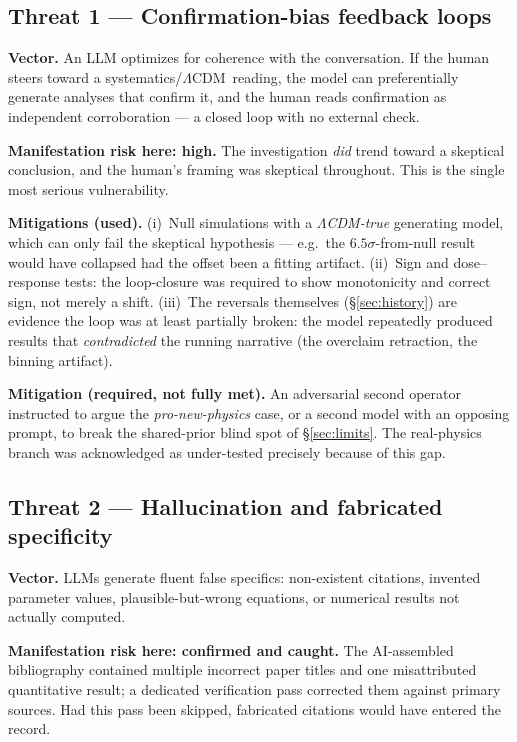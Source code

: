 \documentclass[11pt]{article}
\newcommand{\LCDM}{$\Lambda$CDM}
\begin{document}
\subsection{Threat 1 --- Confirmation-bias feedback loops}
\textbf{Vector.} An LLM optimizes for coherence with the conversation. If the human steers toward a systematics/\LCDM\ reading, the model can preferentially generate analyses that confirm it, and the human reads confirmation as independent corroboration --- a closed loop with no external check.

\textbf{Manifestation risk here: high.} The investigation \emph{did} trend toward a skeptical conclusion, and the human's framing was skeptical throughout. This is the single most serious vulnerability.

\textbf{Mitigations (used).} (i)~Null simulations with a \emph{\LCDM-true} generating model, which can only fail the skeptical hypothesis --- e.g.\ the $6.5\sigma$-from-null result would have collapsed had the offset been a fitting artifact. (ii)~Sign and dose--response tests: the loop-closure was required to show monotonicity and correct sign, not merely a shift. (iii)~The reversals themselves (\S\ref{sec:history}) are evidence the loop was at least partially broken: the model repeatedly produced results that \emph{contradicted} the running narrative (the overclaim retraction, the binning artifact).

\textbf{Mitigation (required, not fully met).} An adversarial second operator instructed to argue the \emph{pro-new-physics} case, or a second model with an opposing prompt, to break the shared-prior blind spot of \S\ref{sec:limits}. The real-physics branch was acknowledged as under-tested precisely because of this gap.

\subsection{Threat 2 --- Hallucination and fabricated specificity}
\textbf{Vector.} LLMs generate fluent false specifics: non-existent citations, invented parameter values, plausible-but-wrong equations, or numerical results not actually computed.

\textbf{Manifestation risk here: confirmed and caught.} The AI-assembled bibliography contained multiple incorrect paper titles and one misattributed quantitative result; a dedicated verification pass corrected them against primary sources. Had this pass been skipped, fabricated citations would have entered the record.
\end{document}
